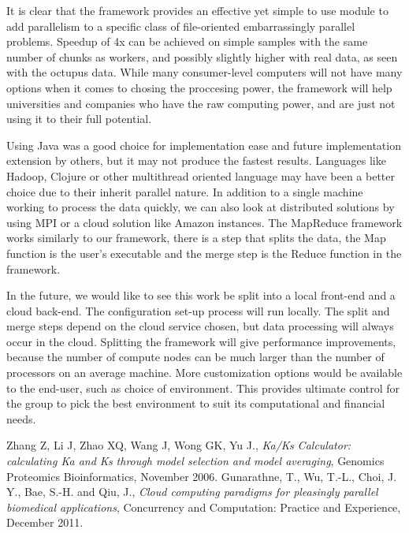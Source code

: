 \documentclass[12pt]{article}
\begin{document}
It is clear that the framework provides an effective yet simple to use module to
add parallelism to a specific class of file-oriented embarrassingly parallel
problems. Speedup of 4x can be achieved on simple samples with the same number
of chunks as workers, and possibly slightly higher with real data, as seen with
the octupus data. While many consumer-level computers will not have many options
when it comes to chosing the proccesing power, the framework will help
universities and companies who have the raw computing power, and are just not
using it to their full potential. 

Using Java was a good choice for implementation ease and future implementation
extension by others, but it may not produce the fastest results. Languages like
Hadoop, Clojure or other multithread oriented language may have been a better
choice due to their inherit parallel nature. In addition to a single machine
working to process the data quickly, we can also look at distributed solutions
by using MPI or a cloud solution like Amazon instances. The MapReduce framework
works similarly to our framework, there is a step that splits the data, the Map
function is the user's executable and the merge step is the Reduce function in
the framework. 

In the future, we would like to see this work be split into a local front-end
and a cloud back-end. The configuration set-up process will run locally. The
split and merge steps depend on the cloud service chosen, but data processing
will always occur in the cloud. Splitting the framework will give performance
improvements, because the number of compute nodes can be much larger than the
number of processors on an average machine. More customization options would be
available to the end-user, such as choice of environment. This provides ultimate
control for the group to pick the best environment to suit its computational and
financial needs.

\begin{thebibliography}{1}
Zhang Z, Li J, Zhao XQ, Wang J, Wong GK, Yu J., \emph{Ka/Ks Calculator: 
calculating Ka and Ks through model selection and model averaging},
Genomics Proteomics Bioinformatics, November 2006.
Gunarathne, T., Wu, T.-L., Choi, J. Y., Bae, S.-H. and Qiu, J., \emph{Cloud
computing paradigms for pleasingly parallel biomedical applications},
Concurrency and Computation: Practice and Experience, December 2011.
\end{thebibliography}
\end{document}
